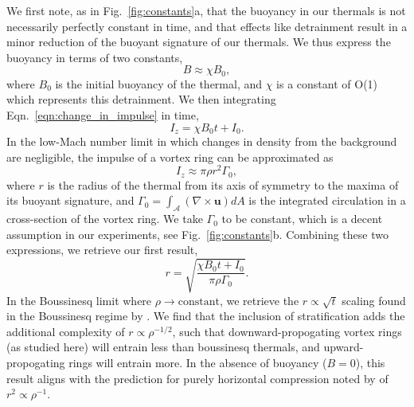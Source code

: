 \documentclass[twocolumn, amsmath, amsfonts, amssymb, trackchanges]{aastex62}
\newcommand{\grad}{\ensuremath{\nabla}}
\begin{document}
We first note, as in Fig.~\ref{fig:constants}a, that the buoyancy in our thermals is not necessarily perfectly constant in time, and that effects like detrainment result in a minor reduction of the buoyant signature of our thermals. 
We thus express the buoyancy in terms of two constants,
\begin{equation}
B \approx \chi B_0,
\end{equation}
where $B_0$ is the initial buoyancy of the thermal, and $\chi$ is a constant of O(1) which represents this detrainment. 
We then integrating Eqn.~\ref{eqn:change_in_impulse} in time,
\begin{equation*}
I_z = \chi B_0 t + I_0.
\end{equation*}
In the low-Mach number limit in which changes in density from the background are negligible, the impulse of a vortex ring can be approximated as
\begin{equation*}
I_z \approx \pi \rho r^2 \Gamma_0,
\end{equation*}
where $r$ is the radius of the thermal from its axis of symmetry to the maxima of its buoyant signature, and $\Gamma_0 = \int_{\mathcal{A}} (\grad\times\bm{u})dA$ is the integrated circulation in a cross-section of the vortex ring. 
We take $\Gamma_0$ to be constant, which is a decent assumption in our experiments, see Fig.~\ref{fig:constants}b.
Combining these two expressions, we retrieve our first result,
\begin{equation}
r = \sqrt{\frac{\chi B_0 t + I_0}{\pi\rho\Gamma_0}}.
\label{eqn:r_theory}
\end{equation}
In the Boussinesq limit where $\rho \rightarrow \text{constant}$, we retrieve the $r \propto \sqrt{t}$ scaling found in the Boussinesq regime by \citet{lecoanet&jeevanjee2018}. 
We find that the inclusion of stratification adds the additional complexity of $r \propto \rho^{-1/2}$, such that downward-propogating vortex rings (as studied here) will entrain less than boussinesq thermals, and upward-propogating rings will entrain more. 
In the absence of buoyancy ($B = 0$), this result aligns with the prediction for purely horizontal compression noted by \citet{brandenburg2016} of $r^2 \propto \rho^{-1}$.
\end{document}
